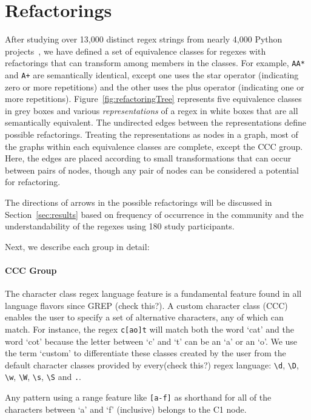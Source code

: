 \section{Refactorings}
\label{sec:refactoring}
After studying over 13,000 distinct regex strings from nearly 4,000 Python projects~\cite{chapman2016}, we have defined a set of equivalence classes for regexes with refactorings that can transform among members in the classes. For example,  \verb!AA*! and \verb!A+! are semantically identical, except one uses the star operator (indicating zero or more repetitions) and the other uses the plus operator (indicating one or more repetitions). Figure~\ref{fig:refactoringTree} represents five equivalence classes in grey boxes and various \emph{representations} of a regex in white boxes that are all semantically equivalent.
The undirected edges between the representations define possible refactorings. Treating the representations as nodes in a graph, most of the graphs within each equivalence classes are complete, except the CCC group. Here, the edges are placed according to small transformations that can occur between pairs of nodes, though any pair of nodes can be considered a potential for refactoring.

The directions of arrows in the possible refactorings will be discussed in Section~\ref{sec:results} based on frequency of occurrence in the community and the understandability of the regexes using 180 study participants.

Next, we describe each group in detail:
\paragraph{CCC Group}
The character class regex language feature is a fundamental feature found in all language flavors since GREP (check this?).  A custom character class (CCC) enables the user to specify a set of alternative characters, any of which can match.  For instance, the regex \verb!c[ao]t! will match both the word `cat' and the word `cot' because the letter between `c' and `t' can be an `a' or an `o'.  We use the term `custom' to differentiate these classes created by the user from the default character classes provided by every(check this?) regex language: \verb!\d!, \verb!\D!, \verb!\w!, \verb!\W!, \verb!\s!, \verb!\S! and \verb!.!.

Any pattern using a range feature like \verb![a-f]! as shorthand for all of the characters between `a' and `f' (inclusive) belongs to the C1 node.

